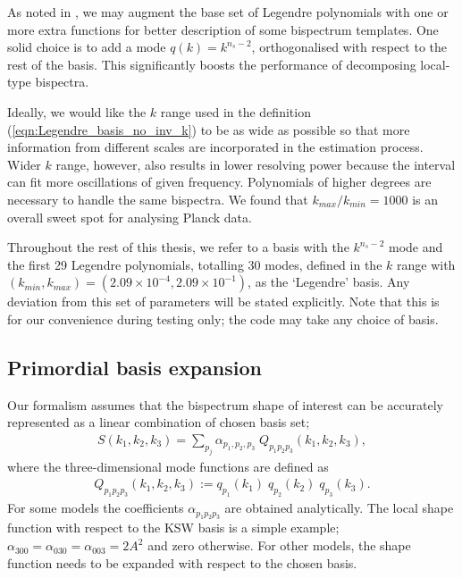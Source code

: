 As noted in \cite{Clarke2021}, we may augment the base set of Legendre polynomials with one or more extra functions for better description of some bispectrum templates. One solid choice is to add a mode $q(k) = k^{n_s -2}$, orthogonalised with respect to the rest of the basis. This significantly boosts the performance of decomposing local-type bispectra.

Ideally, we would like the $k$ range used in the definition (\ref{eqn:Legendre_basis_no_inv_k}) to be as wide as possible so that more information from different scales are incorporated in the estimation process. Wider $k$ range, however, also results in lower resolving power because the interval can fit more oscillations of given frequency. Polynomials of higher degrees are necessary to handle the same bispectra. We found that $k_{max}/k_{min} = 1000$ is an overall sweet spot for analysing Planck data.

Throughout the rest of this thesis, we refer to a basis with the $k^{n_s - 2}$ mode and the first 29 Legendre polynomials, totalling 30 modes, defined in the $k$ range with $(k_{min}, k_{max}) = (2.09 \times 10^{-4}, 2.09 \times 10^{-1})$, as the `Legendre' basis. Any deviation from this set of parameters will be stated explicitly. Note that this is for our convenience during testing only; the code may take any choice of basis.


\subsection{Primordial basis expansion} \label{section:primordial_basis_expansion}

Our formalism assumes that the bispectrum shape of interest can be accurately represented as a linear combination of chosen basis set; 
\begin{align}
	S(k_1,k_2,k_3) = \sum_{p_j} \alpha_{p_1,p_2,p_3} \; Q_{p_1 p_2 p_3}(k_1, k_2, k_3),
\end{align}
where the three-dimensional mode functions are defined as
\begin{align}
	Q_{p_1 p_2 p_3} (k_1, k_2, k_3) := q_{p_1}(k_1) \; q_{p_2}(k_2) \; q_{p_3}(k_3).
\end{align}
For some models the coefficients $\alpha_{p_1 p_2 p_3}$ are obtained analytically. The local shape function with respect to the KSW basis is a simple example; $\alpha_{300}=\alpha_{030}=\alpha_{003}=2A^2$ and zero otherwise. For other models, the shape function needs to be expanded with respect to the chosen basis. 

